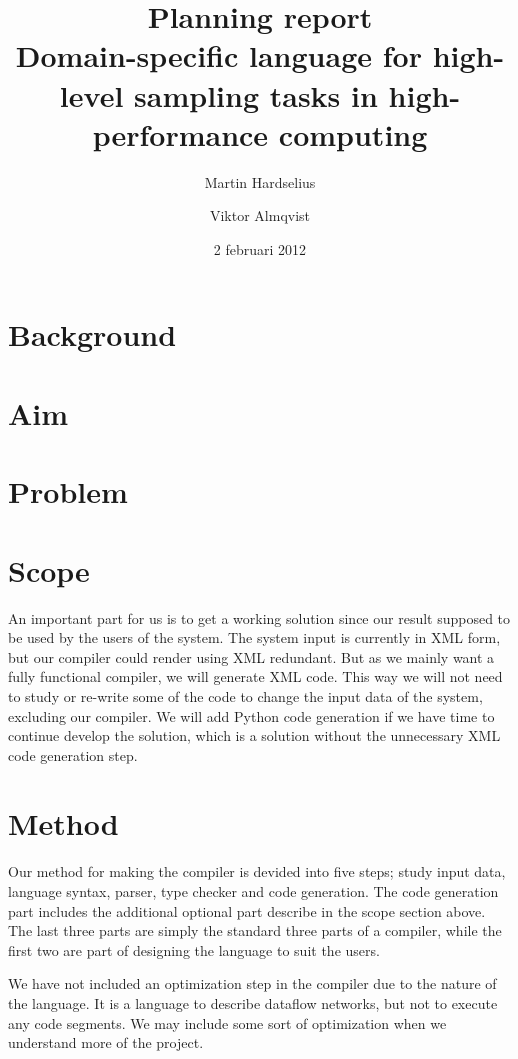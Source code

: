 \documentclass[a4paper]{article}
\title{Planning report\\
  \large{Domain-specific language for high-level
  sampling tasks in high-performance computing
  }
}
\author{Martin Hardselius \and Viktor Almqvist}
\date{2 februari 2012}
\begin{document}
\maketitle
\newpage

\section{Background}

\section{Aim}

\section{Problem}

\section{Scope}

An important part for us is to get a working solution since our result
supposed to be used by the users of the system. The system input is
currently in XML form, but our compiler could render using XML
redundant. But as we mainly want a fully functional compiler, we will
generate XML code. This way we will not need to study or re-write some
of the code to change the input data of the system, excluding our
compiler. We will add Python code generation if we have time to
continue develop the solution, which is a solution without the
unnecessary XML code generation step.



\section{Method}
Our method for making the compiler is devided into five steps; study
input data, language syntax, parser, type checker and code
generation. The code generation part includes the additional optional
part describe in the scope section above. The last three parts are
simply the standard three parts of a compiler, while the first two are
part of designing the language to suit the users.

We have not included an optimization step in the compiler due to the
nature of the language. It is a language to describe dataflow
networks, but not to execute any code segments. We may include some
sort of optimization when we understand more of the project.
\end{document}
